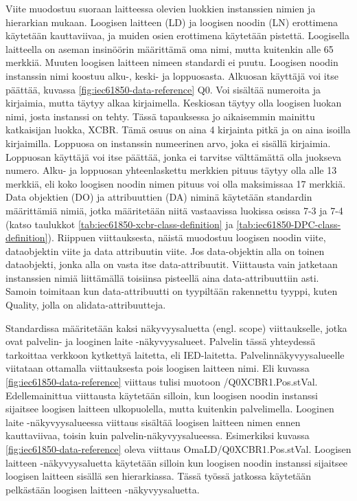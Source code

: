 Viite muodostuu suoraan laitteessa olevien luokkien instanssien nimien ja hierarkian mukaan. Loogisen laitteen (LD) ja loogisen noodin (LN) erottimena käytetään kauttaviivaa, ja muiden osien erottimena käytetään pistettä. Loogisella laitteella on aseman insinöörin määrittämä oma nimi, mutta kuitenkin alle 65 merkkiä. Muuten loogisen laitteen nimeen standardi ei puutu. Loogisen noodin instanssin nimi koostuu alku-, keski- ja loppuosasta. Alkuosan käyttäjä voi itse päättää, kuvassa \ref{fig:iec61850-data-reference} Q0. Voi sisältää numeroita ja kirjaimia, mutta täytyy alkaa kirjaimella. Keskiosan täytyy olla loogisen luokan nimi, josta instanssi on tehty. Tässä tapauksessa jo aikaisemmin mainittu katkaisijan luokka, XCBR. Tämä osuus on aina 4 kirjainta pitkä ja on aina isoilla kirjaimilla. Loppuosa on instanssin numeerinen arvo, joka ei sisällä kirjaimia. Loppuosan käyttäjä voi itse päättää, jonka ei tarvitse välttämättä olla juokseva numero. Alku- ja loppuosan yhteenlaskettu merkkien pituus täytyy olla alle 13 merkkiä, eli koko loogisen noodin nimen pituus voi olla maksimissaa 17 merkkiä. Data objektien (DO) ja attribuuttien (DA) niminä käytetään standardin määrittämiä nimiä, jotka määritetään niitä vastaavissa luokissa osissa 7-3 ja 7-4 (katso taulukkot \ref{tab:iec61850-xcbr-class-definition} ja \ref{tab:iec61850-DPC-class-definition}). Riippuen viittauksesta, näistä muodostuu loogisen noodin viite, dataobjektin viite ja data attribuutin viite. Jos data-objektin alla on toinen dataobjekti, jonka alla on vasta itse data-attribuutit. Viittausta vain jatketaan instanssien nimiä liittämällä toisiinsa pisteellä aina data-attribuuttiin asti. Samoin toimitaan kun data-attribuutti on tyypiltään rakennettu tyyppi, kuten Quality, jolla on alidata-attribuutteja. \cite[s.~181--182]{IEC61850-7-2} \cite[s.~93--95]{IEC61850-7-1}

Standardissa määritetään kaksi näkyvyysaluetta (engl. scope) viittaukselle, jotka ovat palvelin- ja looginen laite -näkyvyysalueet. Palvelin tässä yhteydessä tarkoittaa verkkoon kytkettyä laitetta, eli IED-laitetta. Palvelinnäkyvyysalueelle viitataan ottamalla viittauksesta pois loogisen laitteen nimi. Eli kuvassa \ref{fig:iec61850-data-reference} viittaus tulisi muotoon /Q0XCBR1.Pos.stVal. Edellemainittua viittausta käytetään silloin, kun loogisen noodin instanssi sijaitsee loogisen laitteen ulkopuolella, mutta kuitenkin palvelimella. Looginen laite -näkyvyysalueessa viittaus sisältää loogisen laitteen nimen ennen kauttaviivaa, toisin kuin palvelin-näkyvyysalueessa. Esimerkiksi kuvassa \ref{fig:iec61850-data-reference} oleva viittaus OmaLD/Q0XCBR1.Pos.stVal. Loogisen laitteen -näkyvyysaluetta käytetään silloin kun loogisen noodin instanssi sijaitsee loogisen laitteen sisällä sen hierarkiassa. Tässä työssä jatkossa käytetään pelkästään loogisen laitteen -näkyvyysaluetta. \cite[s.~183]{IEC61850-7-2}

